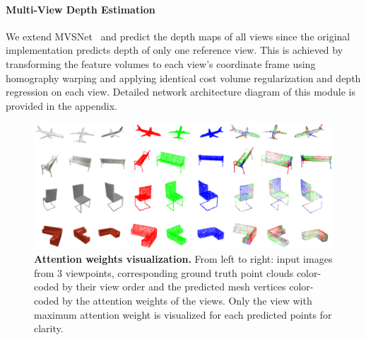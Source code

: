 \label{subsec:depth_prediction}
\paragraph{Multi-View Depth Estimation}
We extend MVSNet~\cite{yao2018mvsnet} and predict the depth maps of all views since the original implementation predicts depth of only one reference view.
This is achieved by transforming the feature volumes to each view's coordinate frame using homography warping
and applying identical cost volume regularization and depth regression on each view.
Detailed network architecture diagram of this module is provided in the appendix.



\begin{figure}[t]
\begin{center}
\includegraphics[width=\linewidth]{imgs/attention_weights_visualization.png}
\end{center}
    \caption{
        \textbf{Attention weights visualization.}
        From left to right: input images from 3 viewpoints, corresponding ground truth point clouds color-coded by their view order and the predicted mesh vertices color-coded by the attention weights of the views.
        Only the view with maximum attention weight is visualized for each predicted points for clarity.
    }
\label{fig:attention_weights}
\end{figure}

